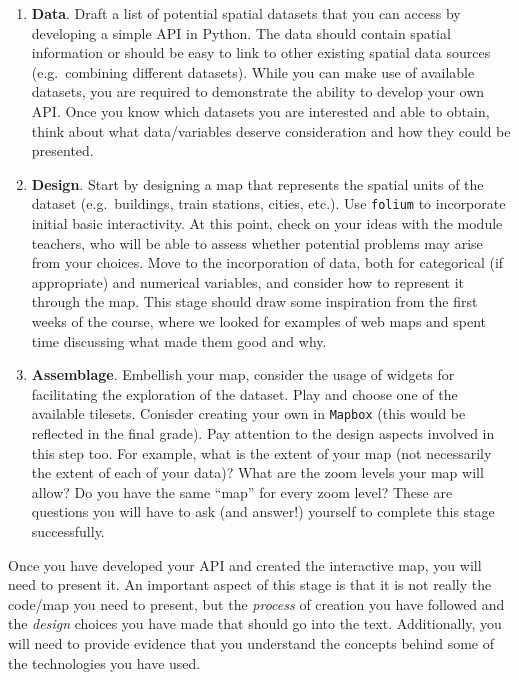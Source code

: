 \documentclass[
  letterpaper,
  DIV=11,
  numbers=noendperiod]{scrreprt}
\providecommand{\tightlist}{%
  \setlength{\itemsep}{0pt}\setlength{\parskip}{0pt}}\usepackage{longtable,booktabs,array}
\begin{document}
\begin{enumerate}
\def\labelenumi{\arabic{enumi}.}
\tightlist
\item
  \textbf{Data}. Draft a list of potential spatial datasets that you can
  access by developing a simple API in Python. The data should contain
  spatial information or should be easy to link to other existing
  spatial data sources (e.g.~combining different datasets). While you
  can make use of available datasets, you are required to demonstrate
  the ability to develop your own API. Once you know which datasets you
  are interested and able to obtain, think about what data/variables
  deserve consideration and how they could be presented.
\item
  \textbf{Design}. Start by designing a map that represents the spatial
  units of the dataset (e.g.~buildings, train stations, cities, etc.).
  Use \texttt{folium} to incorporate initial basic interactivity. At
  this point, check on your ideas with the module teachers, who will be
  able to assess whether potential problems may arise from your choices.
  Move to the incorporation of data, both for categorical (if
  appropriate) and numerical variables, and consider how to represent it
  through the map. This stage should draw some inspiration from the
  first weeks of the course, where we looked for examples of web maps
  and spent time discussing what made them good and why.
\item
  \textbf{Assemblage}. Embellish your map, consider the usage of widgets
  for facilitating the exploration of the dataset. Play and choose one
  of the available tilesets. Conisder creating your own in
  \texttt{Mapbox} (this would be reflected in the final grade). Pay
  attention to the design aspects involved in this step too. For
  example, what is the extent of your map (not necessarily the extent of
  each of your data)? What are the zoom levels your map will allow? Do
  you have the same ``map'' for every zoom level? These are questions
  you will have to ask (and answer!) yourself to complete this stage
  successfully.
\end{enumerate}

Once you have developed your API and created the interactive map, you
will need to present it. An important aspect of this stage is that it is
not really the code/map you need to present, but the \emph{process} of
creation you have followed and the \emph{design} choices you have made
that should go into the text. Additionally, you will need to provide
evidence that you understand the concepts behind some of the
technologies you have used.
\end{document}
